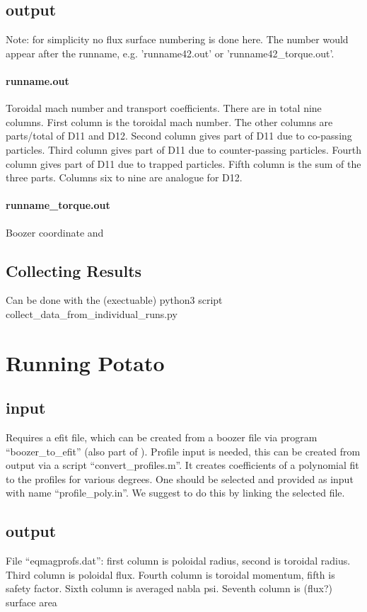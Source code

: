 \subsection{output}
Note: for simplicity no flux surface numbering is done here. The number
would appear after the runname, e.g. 'runname42.out' or 'runname42_torque.out'.

\paragraph{runname.out}
Toroidal mach number and transport coefficients.
There are in total nine columns. First column is the toroidal mach
number. The other columns are parts/total of D11 and D12. Second column
gives part of D11 due to co-passing particles. Third column gives part
of D11 due to counter-passing particles. Fourth column gives part of D11
due to trapped particles. Fifth column is the sum of the three parts.
Columns six to nine are analogue for D12.

\paragraph{runname\_torque.out}
Boozer coordinate and

\subsection{Collecting Results}
Can be done with the (exectuable) python3 script
collect\_data\_from\_individual\_runs.py


\section{Running Potato}
\subsection{input}
Requires a efit file, which can be created from a boozer file via
program ``boozer\_to\_efit'' (also part of \neort).
Profile input is needed, this can be created from  output via a
script ``convert_profiles.m''. It creates coefficients of a polynomial
fit to the profiles for various degrees. One should be selected and
provided as input with name ``profile_poly.in''. We suggest to do this
by linking the selected file.

\subsection{output}
File ``eqmagprofs.dat'': first column is poloidal radius, second is
toroidal radius. Third column is poloidal flux. Fourth column is
toroidal momentum, fifth is safety factor. Sixth column is averaged
nabla psi. Seventh column is (flux?) surface area
